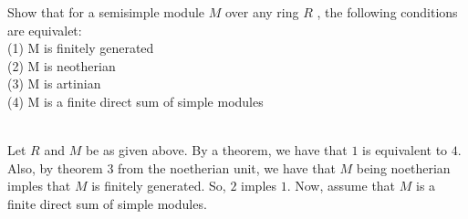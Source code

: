 Show that for a semisimple module $M$ over any ring $R$ , the following conditions are equivalet:\\
(1) M is finitely generated\\
(2) M is neotherian\\
(3) M is artinian\\
(4) M is a finite direct sum of simple modules\\

\begin{solution}\renewcommand{\qedsymbol}{}\ \\
    Let $R$ and $M$ be as given above. By a theorem, we have that $1$ is equivalent to $4$. Also, by
    theorem 3 from the noetherian unit, we have that $M$ being noetherian imples that $M$ is finitely
    generated. So, $2$ imples $1$. Now, assume that $M$ is a finite direct sum of simple modules.

\end{solution}
